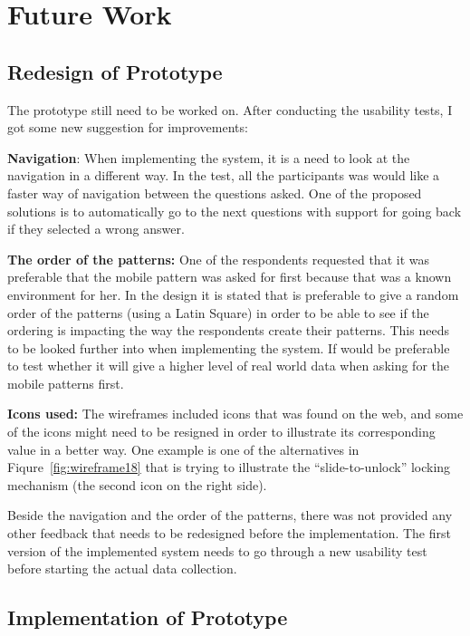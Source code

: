 \chapter{Future Work} \label{chap:FutureWork}

\section{Redesign of Prototype}
  
  The prototype still need to be worked on. After conducting the usability tests, I got some new suggestion for improvements:

  {\bf Navigation}: When implementing the system, it is a need to look at the navigation in a different way. In the test, all the participants was would like a faster way of navigation between the questions asked. One of the proposed solutions is to automatically go to the next questions with support for going back if they selected a wrong answer.

  {\bf The order of the patterns:} One of the respondents requested that it was preferable that the mobile pattern was asked for first because that was a known environment for her. In the design it is stated that is preferable to give a random order of the patterns (using a Latin Square) in order to be able to see if the ordering is impacting the way the respondents create their patterns. This needs to be looked further into when implementing the system. If would be preferable to test whether it will give a higher level of real world data when asking for the mobile patterns first. 

  {\bf Icons used:} The wireframes included icons that was found on the web, and some of the icons might need to be resigned in order to illustrate its corresponding value in a better way. One example is one of the alternatives in Fiqure~\ref{fig:wireframe18} that is trying to illustrate the ``slide-to-unlock'' locking mechanism (the second icon on the right side).

  Beside the navigation and the order of the patterns, there was not provided any other feedback that needs to be redesigned before the implementation. The first version of the implemented system needs to go through a new usability test before starting the actual data collection. 

\section{Implementation of Prototype}

